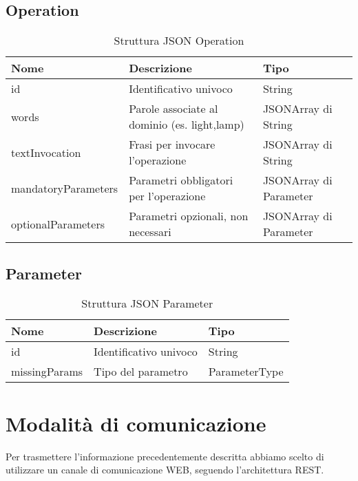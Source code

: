 \documentclass[twoside]{supsistudent}
\begin{document}
\subsection{Operation}
\begin{table}[H]
\centering
\caption{Struttura JSON Operation}
\label{Struttura JSON Operation}
\begin{tabular}{@{}|l|l|l|@{}}
\toprule
Nome                & Descrizione                                                               & Tipo                   \\ \midrule
id                  & Identificativo univoco                                                    & String                 \\ \midrule
words               & Parole associate al dominio (es. light,lamp)                     & JSONArray di String    \\ \midrule
textInvocation      & Frasi per invocare l'operazione         & JSONArray di String    \\ \midrule
mandatoryParameters & Parametri obbligatori per l'operazione     & JSONArray di Parameter \\ \midrule
optionalParameters  & Parametri opzionali, non necessari & JSONArray di Parameter \\ \bottomrule
\end{tabular}
\end{table}

\subsection{Parameter}
\begin{table}[H]
\centering
\caption{Struttura JSON Parameter}
\label{Struttura JSON Parameter}
\begin{tabular}{@{}|l|l|l|@{}}
\toprule
Nome & Descrizione            & Tipo          \\ \midrule
id   & Identificativo univoco & String        \\ \midrule
missingParams & Tipo del parametro     & ParameterType \\ \bottomrule
\end{tabular}
\end{table}
\section{Modalità di comunicazione}
Per trasmettere l'informazione precedentemente descritta abbiamo scelto di utilizzare un canale di comunicazione WEB, seguendo l'architettura REST.\cite{rest}
\end{document}
